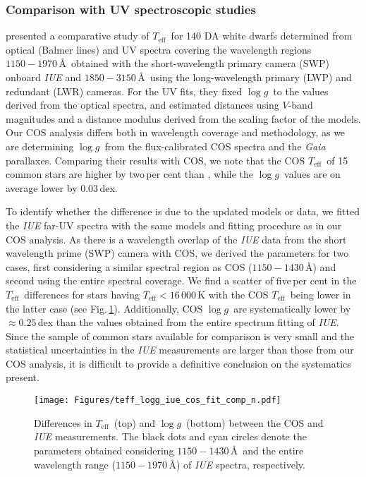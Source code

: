 \documentclass[fleqn,usenatbib, useAMS]{mnras}
\newcommand{\Teff}{\mbox{$T_{\mathrm{eff}}$}}
\newcommand{\logg}{\mbox{$\log g$}}
\begin{document}
\subsubsection{Comparison with UV spectroscopic studies}
\cite{Lajoie2007} presented a comparative study of \Teff\ for 140 DA white dwarfs determined from optical (Balmer lines) and UV spectra covering the wavelength regions $1150-1970$\,\AA\ obtained with the short-wavelength primary camera (SWP) onboard \textit{IUE} and $1850-3150$\,\AA\ using the long-wavelength primary (LWP) and redundant (LWR) cameras. For the UV fits, they fixed \logg\ to the values derived from the optical spectra, and estimated distances using $V$-band magnitudes and a distance modulus derived from the scaling factor of the models. Our COS analysis differs both in  wavelength coverage and methodology, as we are determining \logg\ from the flux-calibrated COS spectra and the \textit{Gaia} parallaxes. Comparing their results with COS, we note that the COS \Teff\ of 15 common stars are higher by two\,per cent than \cite{Lajoie2007}, while the \logg\ values are on average lower by 0.03\,dex. 

To identify whether the difference is due to the updated models or data, we fitted the \textit{IUE} far-UV spectra with the same models and fitting procedure as in our COS analysis. As there is a wavelength overlap of the \textit{IUE} data from the short wavelength prime (SWP) camera with COS, we derived the parameters for two cases, first considering a similar spectral region as COS ($1150-1430$\,\AA) and second using the entire spectral coverage. We find a scatter of five\,per cent in the \Teff\ differences for stars having $\Teff <16\,000$\,K with the COS \Teff\ being lower in the latter case (see Fig.\,\ref{fig:iue_cos_comp}). Additionally, COS \logg\ are systematically lower by $\approx0.25$\,dex than the values obtained from the entire spectrum fitting of \textit{IUE}. Since the sample of common stars available for comparison is very small and the statistical uncertainties in the \textit{IUE} measurements are larger than those from our COS analysis, it is difficult to provide a definitive conclusion on the systematics present.

\begin{figure}
\centering
\texttt{[image: Figures/teff\_logg\_iue\_cos\_fit\_comp\_n.pdf]}
\caption{Differences in \Teff\ (top) and \logg\ (bottom) between the COS and \textit{IUE} measurements. The black dots and cyan circles denote the parameters obtained considering $1150-1430$\,\AA\ and the entire wavelength range ($1150-1970$\,\AA) of \textit{IUE} spectra, respectively.}
\label{fig:iue_cos_comp}
\end{figure}
\end{document}
